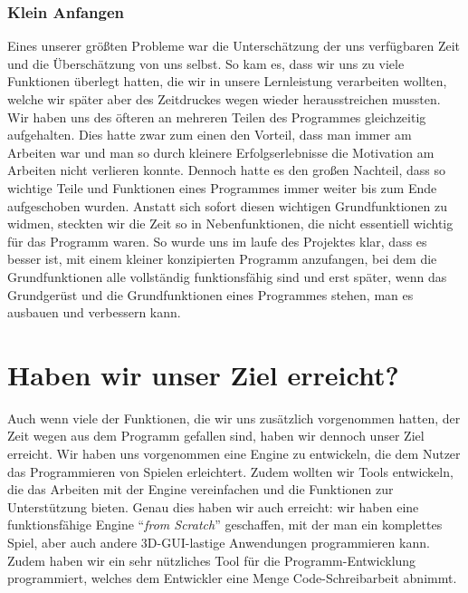 \subsubsection{Klein Anfangen}
\label{kleinanfangen}
Eines unserer größten Probleme war die Unterschätzung der uns verfügbaren Zeit und die Überschätzung von uns selbst. So kam es, dass wir uns zu viele Funktionen überlegt hatten, die wir in unsere Lernleistung verarbeiten wollten, welche wir später aber des Zeitdruckes wegen wieder herausstreichen mussten. 
Wir haben uns des öfteren an mehreren Teilen des Programmes gleichzeitig aufgehalten. Dies hatte zwar zum einen den Vorteil, dass man immer am Arbeiten war und man so durch kleinere Erfolgserlebnisse die Motivation am Arbeiten nicht verlieren konnte. Dennoch hatte es den großen Nachteil, dass so wichtige Teile und Funktionen eines Programmes immer weiter bis zum Ende aufgeschoben wurden. Anstatt sich sofort diesen wichtigen Grundfunktionen zu widmen, steckten wir die Zeit so in Nebenfunktionen, die nicht essentiell wichtig für das Programm waren.
So wurde uns im laufe des Projektes klar, dass es besser ist, mit einem kleiner konzipierten Programm anzufangen, bei dem die Grundfunktionen alle vollständig funktionsfähig sind und erst später, wenn das Grundgerüst und die Grundfunktionen eines Programmes stehen, man es ausbauen und verbessern kann. 

\section{Haben wir unser Ziel erreicht?}
Auch wenn viele der Funktionen, die wir uns zusätzlich vorgenommen hatten, der Zeit wegen aus dem Programm gefallen sind, haben wir dennoch unser Ziel erreicht. Wir haben uns vorgenommen eine Engine zu entwickeln, die dem Nutzer das Programmieren von Spielen erleichtert. Zudem wollten wir Tools entwickeln, die das Arbeiten mit der Engine vereinfachen und die Funktionen zur Unterstützung bieten.
Genau dies haben wir auch erreicht:
wir haben eine funktionsfähige Engine "`\textit{from Scratch}"' geschaffen, mit der man ein komplettes Spiel, aber auch andere 3D-GUI-lastige Anwendungen programmieren kann. Zudem haben wir ein sehr nützliches Tool für die Programm-Entwicklung programmiert, welches dem Entwickler eine Menge Code-Schreibarbeit abnimmt. 

